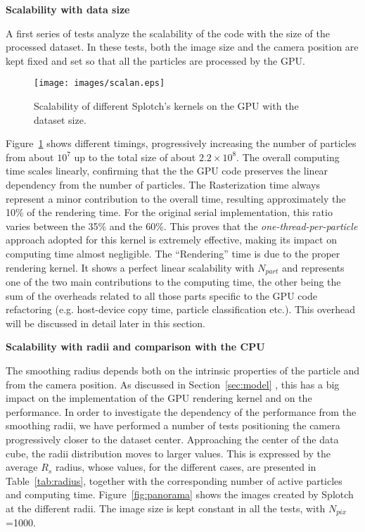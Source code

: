 \documentclass[11pt]{article}
\begin{document}
\medskip
\noindent 
{\bf Scalability with data size}

\noindent
A first series of tests analyze the scalability of the code
with the size of the processed dataset. In these tests, both the image size
and the camera position are kept fixed and set so that all the particles are processed 
by the GPU.

\begin{figure}
\centering
\texttt{[image: images/scalan.eps]}
\caption{Scalability of different Splotch's kernels on the GPU with the dataset size.}
\label{fig:scalability}
\end{figure}

Figure~\ref{fig:scalability} shows different timings, progressively increasing the number of particles
from about $10^7$ up to the total size of about $2.2\times 10^8$. 
The overall computing time scales linearly, 
confirming that the the GPU code preserves the linear dependency from the 
number of particles. 
The Rasterization time always represent 
a minor contribution to the overall time, resulting approximately the 10\% of the rendering 
time. For the original serial implementation, this ratio varies between the 35\% and the 60\%.
This proves that the {\it one-thread-per-particle} approach adopted for this kernel
is extremely effective, making its impact on computing time almost negligible.
The ``Rendering'' time 
is due to the proper rendering kernel. It shows a perfect linear scalability
with $N_{part}$ and represents one of the two main contributions
to the computing time, the other being the sum of the overheads related to all those 
parts specific to the GPU code refactoring 
(e.g. host-device copy time, particle classification etc.). 
This overhead  will be discussed in detail later in this section.

\medskip
\noindent
{\bf Scalability with radii and comparison with the CPU}

\noindent
The smoothing radius depends both on the intrinsic properties of the particle
and from the camera position. 
As discussed in Section~\ref{sec:model} , this has a big impact 
on the implementation of the GPU rendering kernel and
on the performance. In order to investigate the dependency of the performance from
the smoothing radii, we have performed a number of tests 
positioning the camera progressively closer to the dataset center. 
Approaching the center of the 
data cube, the radii distribution moves to larger values. This is expressed 
by the average $R_s$ radius, whose values, for the different cases, are presented in 
Table~\ref{tab:radius}, together with the corresponding number of active particles and computing time. 
Figure~\ref{fig:panorama} shows the images created by Splotch at the different radii.
The image size is kept constant in all the tests, with $N_{pix}$=1000.
\end{document}
